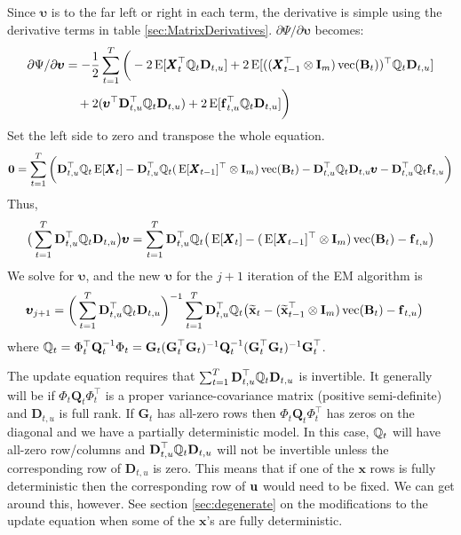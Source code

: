 \documentclass[]{article}
\def\uupsilon{\pmb{\upsilon}}
\def\BB{\mbox{$\mathbf B$}}	\def\bb{\mbox{$\mathbf b$}}
\def\DD{\mbox{$\mathbf D$}}	\def\dd{\mbox{$\mathbf d$}}
\def\GG{\mbox{$\mathbf G$}}	\def\gg{\mbox{$\mathbf g$}}
\def\II{\mbox{$\mathbf I$}} \def\ii{\mbox{$\mathbf i$}}
\def\QQ{\mbox{$\mathbf Q$}}	 \def\qq{\mbox{$\mathbf q$}}
\def\XX{\mbox{$\pmb{X}$}}	\def\xx{\mbox{$\pmb{x}$}}
\def\E{\,\textup{\textrm{E}}}
\def\vec{\,\textup{\textrm{vec}}}
\def\hatxt{\widetilde{\mbox{$\mathbf x$}}_t}
\def\hatxtm{\widetilde{\mbox{$\mathbf x$}}_{t-1}}
\begin{document}
Since $\uupsilon$ is to the far left or right in each term, the derivative is simple using the derivative terms in table \ref{sec:MatrixDerivatives}.
$\partial\Psi/\partial\pmb{\upsilon}$ becomes:
\begin{equation}\label{eq:u.general1b}
\begin{split}
\partial\Psi/\partial\pmb{\upsilon}
&= - \frac{1}{2}\sum_{t=1}^T \bigg(  
-2\E[\XX_t^\top\Qm_t\DD_{t,u}] +  2\E[(( \XX_{t-1}^\top \otimes \II_m)\vec(\BB_t))^\top \Qm_t\DD_{t,u}] \\
&\quad + 2(\uupsilon^\top\DD_{t,u}^\top\Qm_t\DD_{t,u}) + 2\E[ \ff_{t,u}^\top\Qm_t\DD_{t,u} ] \bigg)
\end{split}\end{equation}
Set the left side to zero and transpose the whole equation. 
\begin{equation}\label{eq:u.general4}
\begin{split}
\mathbf{0}= \sum_{t=1}^T \bigg( \DD_{t,u}^\top\Qm_t\E[\XX_t] - \DD_{t,u}^\top\Qm_t(\E[\XX_{t-1}]^\top \otimes \II_m)\vec(\BB_t) 
- \DD_{t,u}^\top\Qm_t\DD_{t,u}\uupsilon
 - \DD_{t,u}^\top\Qm_t\ff_{t,u} \bigg)
\end{split}
\end{equation}
Thus,
\begin{equation}\label{eq:u.general5}
\big(\sum_{t=1}^T \DD_{t,u}^\top\Qm_t\DD_{t,u} \big)\uupsilon
 = \sum_{t=1}^T \DD_{t,u}^\top\Qm_t\big(\E[ \XX_t ]- (\E[\XX_{t-1}]^\top \otimes \II_m)\vec(\BB_t) - \ff_{t,u} \big)
\end{equation}
We solve for $\uupsilon$, and the new $\uupsilon$ for the $j+1$ iteration of the EM algorithm is
\begin{equation}\label{eq:u.general.update1}
\begin{split}
\uupsilon_{j+1} &= \bigg(\sum_{t=1}^T \DD_{t,u}^\top\Qm_t\DD_{t,u} \bigg)^{-1}
  \sum_{t=1}^T \DD_{t,u}^\top\Qm_t\big(\hatxt- (\hatxtm^\top \otimes \II_m)\vec(\BB_t) - \ff_{t,u} \big)
\end{split}
\end{equation}
where $\Qm_t = \Phi_t^\top\QQ_t^{-1}\Phi_t = \GG_t(\GG_t^\top\GG_t)^{-1}\QQ_t^{-1}(\GG_t^\top\GG_t)^{-1}\GG_t^\top$.

The update equation requires that $\sum_{t=1}^T \DD_{t,u}^\top\Qm_t\DD_{t,u}$ is invertible. It generally will be if $\Phi_t\QQ_t\Phi_t^\top$ is a proper variance-covariance matrix (positive semi-definite) and $\DD_{t,u}$ is full rank.  If $\GG_t$ has all-zero rows then $\Phi_t\QQ_t\Phi_t^\top$ has zeros on the diagonal and we have a partially deterministic model.  In this case, $\mathbb{Q}_t$ will have all-zero row/columns and $\DD_{t,u}^\top\Qm_t\DD_{t,u}$ will not be invertible unless the corresponding row of $\DD_{t,u}$ is zero.  This means that if one of the $\xx$ rows is fully deterministic then the corresponding row of $\mbox{$\mathbf u$}$ would need to be fixed.  We can get around this, however.  See section \ref{sec:degenerate} on the modifications to the update equation when some of the $\xx$'s are fully deterministic.
\end{document}
